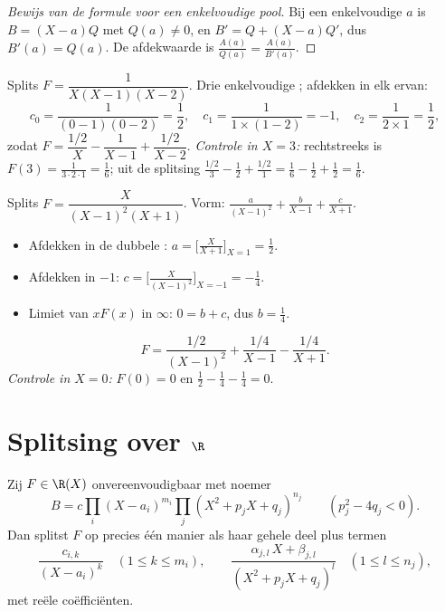 \begin{proof}[Bewijs van de formule voor een enkelvoudige pool]
Bij een enkelvoudige  $a$ is $B = (X - a) Q$ met $Q(a) \neq 0$, en
$B' = Q + (X - a) Q'$, dus $B'(a) = Q(a)$. De afdekwaarde is
$\frac{A(a)}{Q(a)} = \frac{A(a)}{B'(a)}$.
\end{proof}

\begin{example}\label{ex:b1:fractions:simple}
Splits $F = \dfrac{1}{X(X-1)(X-2)}$. Drie enkelvoudige ; afdekken in
elk ervan:
\[
c_0 = \frac{1}{(0-1)(0-2)} = \frac12,
\quad
c_1 = \frac{1}{1 \times (1 - 2)} = -1,
\quad
c_2 = \frac{1}{2 \times 1} = \frac12,
\]
zodat $F = \dfrac{1/2}{X} - \dfrac{1}{X-1} + \dfrac{1/2}{X-2}$.
\emph{Controle in $X = 3$:} rechtstreeks is $F(3) = \frac{1}{3\cdot2\cdot1}
= \frac16$; uit de splitsing $\frac{1/2}{3} - \frac{1}{2} +
\frac{1/2}{1} = \frac16 - \frac12 + \frac12 = \frac16$.
\end{example}

\begin{example}\label{ex:b1:fractions:multiple}
Splits $F = \dfrac{X}{(X-1)^2 (X+1)}$. Vorm: $\frac{a}{(X-1)^2} +
\frac{b}{X-1} + \frac{c}{X+1}$.
\begin{itemize}
  \item Afdekken in de dubbele : $a = \bigl[\frac{X}{X+1}\bigr]_{X=1}
        = \frac12$.
  \item Afdekken in $-1$: $c = \bigl[\frac{X}{(X-1)^2}\bigr]_{X=-1} =
        -\frac14$.
  \item Limiet van $xF(x)$ in $\infty$: $0 = b + c$, dus $b = \frac14$.
\end{itemize}
\[
F = \frac{1/2}{(X-1)^2} + \frac{1/4}{X-1} - \frac{1/4}{X+1} .
\]
\emph{Controle in $X = 0$:} $F(0) = 0$ en $\frac12 - \frac14 - \frac14 =
0$.
\end{example}

\section{Splitsing over $\R$}

\begin{theorem}\label{thm:b1:fractions:real}
Zij $F \in \R(X)$ onvereenvoudigbaar met noemer
\[
B = c \prod_i (X - a_i)^{m_i} \prod_j (X^2 + p_j X + q_j)^{n_j}
\qquad (p_j^2 - 4q_j < 0).
\]
Dan splitst $F$ op precies één manier als haar gehele deel plus termen
\[
\frac{c_{i,k}}{(X - a_i)^k} \quad (1 \leq k \leq m_i),
\qquad
\frac{\alpha_{j,l}\, X + \beta_{j,l}}{(X^2 + p_j X + q_j)^{l}}
\quad (1 \leq l \leq n_j),
\]
met reële coëfficiënten.
\end{theorem}

